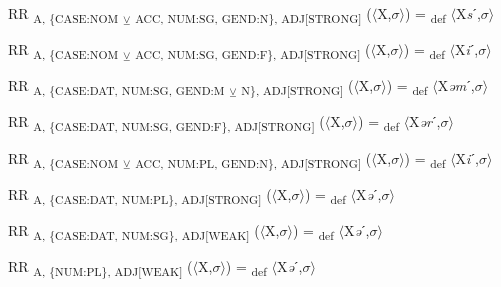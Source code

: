 {\begin{exe}
 RR \textsubscript{A, \{CASE:NOM} \textsubscript{${\veebar}$}\textsubscript{ ACC, NUM:SG, GEND:N\}, ADJ[STRONG]} ($\langle$X,$\sigma $$\rangle$) = \textsubscript{def} $\langle$X\textit{s}ˊ,$\sigma $$\rangle$
\end{exe}

\begin{exe}
 RR \textsubscript{A, \{CASE:NOM} \textsubscript{${\veebar}$}\textsubscript{ ACC, NUM:SG, GEND:F\}, ADJ[STRONG]} ($\langle$X,$\sigma $$\rangle$) = \textsubscript{def} $\langle$X\textit{i}ˊ,$\sigma $$\rangle$
\end{exe}

\begin{exe}
 RR \textsubscript{A, \{CASE:DAT, NUM:SG, GEND:M} \textsubscript{${\veebar}$}\textsubscript{ N\}, ADJ[STRONG]} ($\langle$X,$\sigma $$\rangle$) = \textsubscript{def} $\langle$X\textit{əm}ˊ,$\sigma $$\rangle$
\end{exe}

\begin{exe}
 RR \textsubscript{A, \{CASE:DAT, NUM:SG, GEND:F\}, ADJ[STRONG]} ($\langle$X,$\sigma $$\rangle$) = \textsubscript{def} $\langle$X\textit{ər}ˊ,$\sigma $$\rangle$
\end{exe}

\begin{exe}
 RR \textsubscript{A, \{CASE:NOM} \textsubscript{${\veebar}$}\textsubscript{ ACC, NUM:PL, GEND:N\}, ADJ[STRONG]} ($\langle$X,$\sigma $$\rangle$) = \textsubscript{def} $\langle$X\textit{i}ˊ,$\sigma $$\rangle$
\end{exe}

\begin{exe}
 RR \textsubscript{A, \{CASE:DAT, NUM:PL\}, ADJ[STRONG]} ($\langle$X,$\sigma $$\rangle$) = \textsubscript{def} $\langle$X\textit{ə}ˊ,$\sigma $$\rangle$
\end{exe}

\begin{exe}
 RR \textsubscript{A, \{CASE:DAT, NUM:SG\}, ADJ[WEAK]} ($\langle$X,$\sigma $$\rangle$) = \textsubscript{def} $\langle$X\textit{ə}ˊ,$\sigma $$\rangle$
\end{exe}

\begin{exe}
 RR \textsubscript{A, \{NUM:PL\}, ADJ[WEAK]} ($\langle$X,$\sigma $$\rangle$) = \textsubscript{def} $\langle$X\textit{ə}ˊ,$\sigma $$\rangle$
\end{exe}

}
